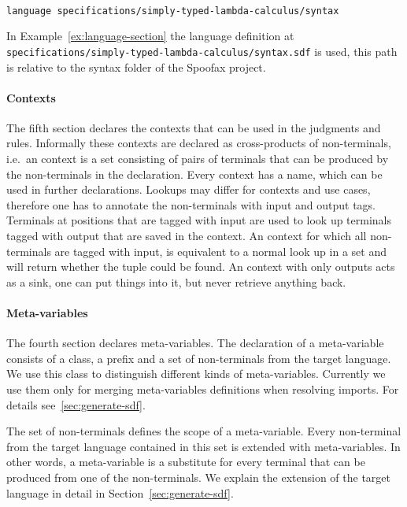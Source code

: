 \begin{example}{~}
\begin{lstlisting}[language=sltc]
language specifications/simply-typed-lambda-calculus/syntax
\end{lstlisting}
\label{ex:language-section}
\end{example}

In Example~\ref{ex:language-section} the language definition at
\lstinline[breaklines=true]|specifications/simply-typed-lambda-calculus/syntax.sdf|
is used, this path is relative to the syntax folder of the Spoofax
project.

\paragraph{Contexts} The fifth section declares the contexts that can
be used in the judgments and rules. Informally these contexts are
declared as cross-products of non-terminals, i.e.\ an context is a set
consisting of pairs of terminals that can be produced by the
non-terminals in the declaration. Every context has a name, which can
be used in further declarations. Lookups may differ for contexts and
use cases, therefore one has to annotate the non-terminals with input
and output tags. Terminals at positions that are tagged with input are
used to look up terminals tagged with output that are saved in the
context. An context for which all non-terminals are tagged with input,
is equivalent to a normal look up in a set and will return whether the
tuple could be found. An context with only outputs acts as a sink, one
can put things into it, but never retrieve anything back.

\paragraph{Meta-variables} The fourth section declares
meta-variables. The declaration of a meta-variable consists of a
class, a prefix and a set of non-terminals from the target
language. We use this class to distinguish different kinds of
meta-variables. Currently we use them only for merging meta-variables
definitions when resolving imports. For details
see~\ref{sec:generate-sdf}.

The set of non-terminals defines the scope of a meta-variable. Every
non-terminal from the target language contained in this set is
extended with meta-variables. In other words, a meta-variable is a
substitute for every terminal that can be produced from one of the
non-terminals. We explain the extension of the target language in
detail in Section~\ref{sec:generate-sdf}.

